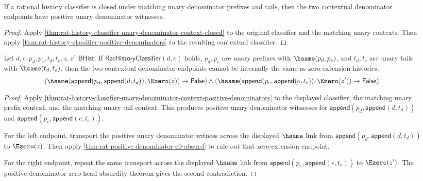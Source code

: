 \begin{theorem}
\label{thm:rat-history-classifier-unary-denominator-context-positive-denominators}
If a rational history classifier is closed under matching unary denominator
prefixes and tails, then the two contextual denominator endpoints have positive
unary denominator witnesses.
\end{theorem}
\begin{proof}
Apply \autoref{thm:rat-history-classifier-unary-denominator-context-closed}
to the original classifier and the matching unary contexts. Then apply
\autoref{thm:rat-history-classifier-positive-denominators} to the resulting
contextual classifier.
\end{proof}

\begin{theorem}
\label{thm:rat-history-classifier-unary-context-zero-extension-endpoint-exclusion}
Let $d,e,p_d,p_e,t_d,t_e,z,z':\mathsf{BHist}$. If
$\mathsf{RatHistoryClassifier}(d,e)$ holds, $p_d,p_e$ are unary prefixes with
$\hsame(p_d,p_e)$, and $t_d,t_e$ are unary tails with $\hsame(t_d,t_e)$, then
the two contextual denominator endpoints cannot be internally the same as
zero-extension histories:
$$
(\hsame(\mathsf{append}(p_d,\mathsf{append}(d,t_d)),\Ezero(z))\to
\mathsf{False})\land
(\hsame(\mathsf{append}(p_e,\mathsf{append}(e,t_e)),\Ezero(z'))\to
\mathsf{False}).
$$
\end{theorem}
\begin{proof}
Apply
\autoref{thm:rat-history-classifier-unary-denominator-context-positive-denominators}
to the displayed classifier, the matching unary prefix context, and the
matching unary tail context. This produces positive unary denominator witnesses
for $\mathsf{append}(p_d,\mathsf{append}(d,t_d))$ and
$\mathsf{append}(p_e,\mathsf{append}(e,t_e))$.

For the left endpoint, transport the positive unary denominator witness across
the displayed $\hsame$ link from
$\mathsf{append}(p_d,\mathsf{append}(d,t_d))$ to $\Ezero(z)$. Then apply
\autoref{thm:rat-positive-denominator-e0-absurd} to rule out that
zero-extension endpoint.

For the right endpoint, repeat the same transport across the displayed
$\hsame$ link from $\mathsf{append}(p_e,\mathsf{append}(e,t_e))$ to
$\Ezero(z')$. The positive-denominator zero-head absurdity theorem gives the
second contradiction.
\end{proof}

